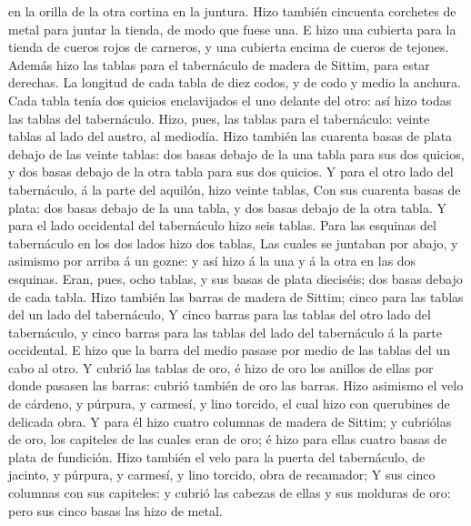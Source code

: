 en la orilla de la otra cortina en la juntura.  Hizo
también cincuenta corchetes de metal para juntar la tienda, de modo que
fuese una.  E hizo una cubierta para la tienda de cueros
rojos de carneros, y una cubierta encima de cueros de tejones.
 Además hizo las tablas para el tabernáculo de madera de
Sittim, para estar derechas.  La longitud de cada tabla
de diez codos, y de codo y medio la anchura.  Cada tabla
tenía dos quicios enclavijados el uno delante del otro: así hizo todas
las tablas del tabernáculo.  Hizo, pues, las tablas para
el tabernáculo: veinte tablas al lado del austro, al mediodía.
 Hizo también las cuarenta basas de plata debajo de las
veinte tablas: dos basas debajo de la una tabla para sus dos quicios, y
dos basas debajo de la otra tabla para sus dos quicios. 
Y para el otro lado del tabernáculo, á la parte del aquilón, hizo veinte
tablas,  Con sus cuarenta basas de plata: dos basas
debajo de la una tabla, y dos basas debajo de la otra tabla.
 Y para el lado occidental del tabernáculo hizo seis
tablas.  Para las esquinas del tabernáculo en los dos
lados hizo dos tablas,  Las cuales se juntaban por abajo,
y asimismo por arriba á un gozne: y así hizo á la una y á la otra en las
dos esquinas.  Eran, pues, ocho tablas, y sus basas de
plata dieciséis; dos basas debajo de cada tabla.  Hizo
también las barras de madera de Sittim; cinco para las tablas del un
lado del tabernáculo,  Y cinco barras para las tablas del
otro lado del tabernáculo, y cinco barras para las tablas del lado del
tabernáculo á la parte occidental.  E hizo que la barra
del medio pasase por medio de las tablas del un cabo al otro.
 Y cubrió las tablas de oro, é hizo de oro los anillos de
ellas por donde pasasen las barras: cubrió también de oro las barras.
 Hizo asimismo el velo de cárdeno, y púrpura, y carmesí,
y lino torcido, el cual hizo con querubines de delicada obra.
 Y para él hizo cuatro columnas de madera de Sittim; y
cubriólas de oro, los capiteles de las cuales eran de oro; é hizo para
ellas cuatro basas de plata de fundición.  Hizo también
el velo para la puerta del tabernáculo, de jacinto, y púrpura, y
carmesí, y lino torcido, obra de recamador;  Y sus cinco
columnas con sus capiteles: y cubrió las cabezas de ellas y sus molduras
de oro: pero sus cinco basas las hizo de metal.

